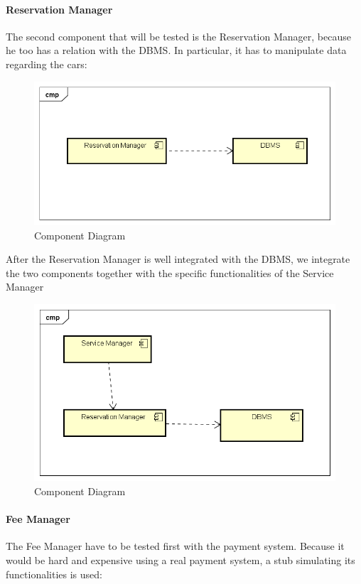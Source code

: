 \paragraph{Reservation Manager}
The second component that will be tested is the Reservation Manager, because he too has a relation with the DBMS. In particular, it has to manipulate data regarding the cars:

\begin{figure}[H]	
	\centering
	\includegraphics[width=\textwidth]{img/ResMan_DBMS_int}
	\caption{Component Diagram}
\end{figure}

After the Reservation Manager is well integrated with the DBMS, we integrate the two components together with the specific functionalities of the Service Manager

\begin{figure}[H]	
	\centering
	\includegraphics[width=\textwidth]{img/ResMan_SrvMan_int}
	\caption{Component Diagram}
\end{figure}
\paragraph{Fee Manager}
The Fee Manager have to be tested first with the payment system. Because it would be hard and expensive using a real payment system, a stub simulating its functionalities is used:


